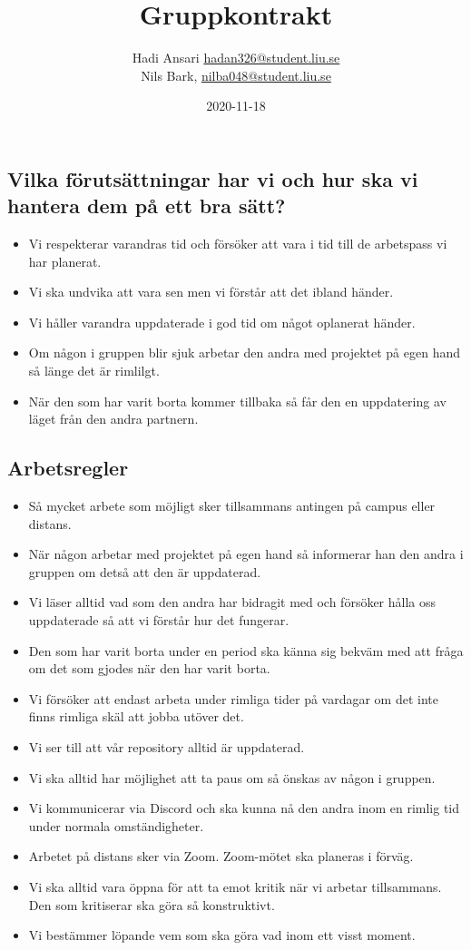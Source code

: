 \documentclass{mall}
\author{Hadi Ansari \url{hadan326@student.liu.se}\\
  Nils Bark, \url{nilba048@student.liu.se}}
\title{Gruppkontrakt}
\date{2020-11-18}
\begin{document}
\projectpage


\subsection*{Vilka förutsättningar har vi och hur ska vi hantera dem på ett bra sätt?}
\begin{itemize}
\item Vi respekterar varandras tid och försöker att vara i tid till de arbetspass vi har planerat.
\item Vi ska undvika att vara sen men vi förstår att det ibland händer.
\item Vi håller varandra uppdaterade i god tid om något oplanerat händer.
\item Om någon i gruppen blir sjuk arbetar den andra med projektet på egen hand så länge det är rimlilgt.
\item När den som har varit borta kommer tillbaka så får den en uppdatering av läget från den andra partnern.

\end{itemize}


\subsection*{Arbetsregler}
\begin{itemize}
\item Så mycket arbete som möjligt sker tillsammans antingen på campus eller distans.
\item När någon arbetar med projektet på egen hand så informerar han den andra i gruppen om detså att den är uppdaterad.
\item Vi läser alltid vad som den andra har bidragit med och försöker hålla oss uppdaterade så att vi förstår hur det fungerar.
\item Den som har varit borta under en period ska känna sig bekväm med att fråga om det som gjodes när den har varit borta. 
\item Vi försöker att endast arbeta under rimliga tider på vardagar om det inte finns rimliga skäl att jobba utöver det.
\item Vi ser till att vår repository alltid är uppdaterad.
\item Vi ska alltid har möjlighet att ta paus om så önskas av någon i gruppen.
\item Vi kommunicerar via Discord och ska kunna nå den andra inom en rimlig tid under normala omständigheter.
\item Arbetet på distans sker via Zoom. Zoom-mötet ska planeras i förväg.
\item Vi ska alltid vara öppna för att ta emot kritik när vi arbetar tillsammans. Den som kritiserar ska göra så konstruktivt.
\item Vi bestämmer löpande vem som ska göra vad inom ett visst moment.
\end{itemize}
\end{document}
